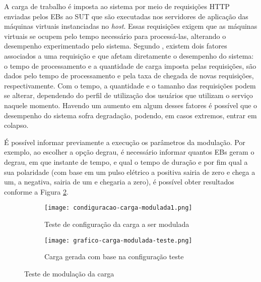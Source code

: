 A carga de trabalho é imposta ao sistema por meio de requisições HTTP enviadas pelos EBs ao SUT que são executadas nos servidores de aplicação das máquinas virtuais instanciadas no \textit{host}. Essas requisições exigem que as máquinas virtuais se ocupem pelo tempo necessário para processá-las, alterando o desempenho experimentado pelo sistema.
Segundo , existem dois fatores associados a uma requisição e que afetam diretamente o desempenho do sistema:
o tempo de processamento e a quantidade de carga imposta pelas requisições, são dados pelo tempo de processamento e pela taxa de chegada de novas requisições, respectivamente. Com o tempo, a quantidade e o tamanho das requisições podem se alterar, dependendo do perfil de utilização dos usuários que utilizam o serviço naquele momento. Havendo um aumento em algum desses fatores é possível que o desempenho do sistema sofra degradação, podendo, em casos extremos, entrar em colapso.

É possível informar previamente a execução os parâmetros da modulação. Por exemplo, ao escolher a opção degrau, é necessário informar quantos EBs geram o degrau, em que instante de tempo, e qual o tempo de duração e por fim qual a sua polaridade (com base em um pulso elétrico a positiva sairia de zero e chega a um, a negativa, sairia de um e chegaria a zero), é possível obter resultados conforme a Figura \ref{fig:grafico-carga-modulada-teste}.

\begin{figure}[!htb]
	\centering
	\begin{subfigure}{\linewidth}
		\centering
		\texttt{[image: condiguracao-carga-modulada1.png]}
		\caption{Teste de configuração da carga a ser modulada}
		\label{fig:configuracao-carga-modulada-teste}
	\end{subfigure}
	
	\begin{subfigure}{\linewidth}
		\centering
		\texttt{[image: grafico-carga-modulada-teste.png]}
		\caption{Carga gerada com base na configuração teste}
		\label{fig:grafico-carga-modulada-teste}
	\end{subfigure}  
	\caption{Teste de modulação da carga}  
	\label{fig:carga-modulada-teste}
	\fautor
\end{figure}  

